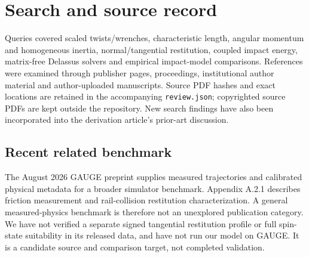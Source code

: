 \documentclass[11pt,a4paper]{article}
\begin{document}
\clearpage
\section{Search and source record}
Queries covered scaled twists/wrenches, characteristic length, angular momentum and homogeneous inertia, normal/tangential restitution, coupled impact energy, matrix-free Delassus solvers and empirical impact-model comparisons. References were examined through publisher pages, proceedings, institutional author material and author-uploaded manuscripts. Source PDF hashes and exact locations are retained in the accompanying \texttt{review.json}; copyrighted source PDFs are kept outside the repository. New search findings have also been incorporated into the derivation article's prior-art discussion.

\subsection*{Recent related benchmark}
The August 2026 GAUGE preprint supplies measured trajectories and calibrated physical metadata for a broader simulator benchmark\cite{gauge}. Appendix A.2.1 describes friction measurement and rail-collision restitution characterization. A general measured-physics benchmark is therefore not an unexplored publication category. We have not verified a separate signed tangential restitution profile or full spin-state suitability in its released data, and have not run our model on GAUGE. It is a candidate source and comparison target, not completed validation.
\end{document}
